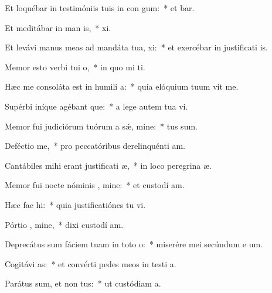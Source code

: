 \item Et loquébar in testimóniis tuis in con gum:~* et  bar.
\item Et meditábar in man is,~*  xi.
\item Et levávi manus meas ad mandáta tua,  xi:~* et exercébar in justificati is.
\item Memor esto verbi tui  o,~* in quo mi  ti.
\item Hæc me consoláta est in humili a:~* quia elóquium tuum vit me.
\item Supérbi iníque agébant que:~* a lege autem tua  vi.
\item Memor fui judiciórum tuórum a sǽ, mine:~*  tus sum.
\item Deféctio  me,~* pro peccatóribus derelinquénti  am.
\item Cantábiles mihi erant justificati æ,~* in loco peregrina æ.
\item Memor fui nocte nóminis , mine:~* et custodí  am.
\item Hæc fac  hi:~* quia justificatiónes tu vi.
\item Pórtio , mine,~* dixi custodí  am.
\item Deprecátus sum fáciem tuam in toto  o:~* miserére mei secúndum e um.
\item Cogitávi  as:~* et convérti pedes meos in testi a.
\item Parátus sum, et non  tus:~* ut custódiam  a.
